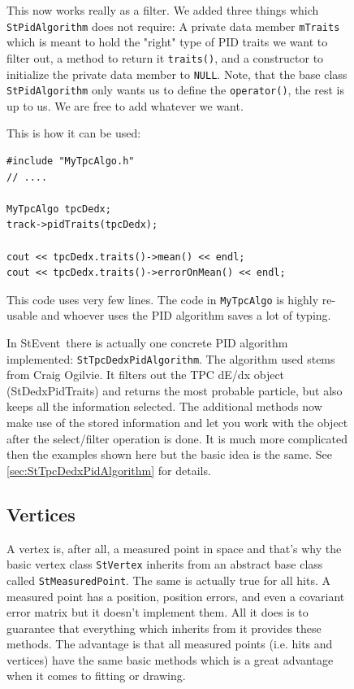 \documentclass[twoside]{article}
\newcommand{\StEvent}{\textsf{StEvent}}
\begin{document}
\begin{figure}[htb]
\begin{center}
This now works really as a filter. We added three things which
\texttt{StPidAlgorithm} does not require: A private data member
\texttt{mTraits} which is meant to hold the "right" type of PID traits
we want to filter out, a method to return it \texttt{traits()}, and a
constructor to initialize the private data member to \texttt{NULL}.
Note, that the base class \texttt{StPidAlgorithm} only wants us to
define the \texttt{operator()}, the rest is up to us. We are free to
add whatever we want.

This is how it can be used:
\begin{verbatim}
#include "MyTpcAlgo.h"
// ....

MyTpcAlgo tpcDedx;
track->pidTraits(tpcDedx);

cout << tpcDedx.traits()->mean() << endl;
cout << tpcDedx.traits()->errorOnMean() << endl;
\end{verbatim}

This code uses very few lines. The code in \texttt{MyTpcAlgo} is
highly re-usable and whoever uses the PID algorithm saves a lot of
typing.

 In \StEvent\ there is actually one
concrete PID algorithm implemented: \texttt{StTpcDedxPidAlgorithm}.
The algorithm used stems from Craig Ogilvie.  It filters out the TPC
dE/dx object (StDedxPidTraits) and returns the most probable particle,
but also keeps all the information selected. The additional methods
now make use of the stored information and let you work with the
object after the select/filter operation is done. It is much more
complicated then the examples shown here but the basic idea is the
same. See \ref{sec:StTpcDedxPidAlgorithm} for details.

\subsection{Vertices}
\label{sec:vertices}
  
  

A vertex is, after all, a measured point in space and that's why the
basic vertex class \texttt{StVertex} inherits from an abstract base
class called \texttt{StMeasuredPoint}. The same is actually true for
all hits.  A measured point has a position, position errors, and even
a covariant error matrix but it doesn't implement them. All it does is
to guarantee that everything which inherits from it provides these
methods. The advantage is that all measured points (i.e. hits and
vertices) have the same basic methods which is a great advantage when
it comes to fitting or drawing.


\end{center}
\end{figure}
\end{document}
